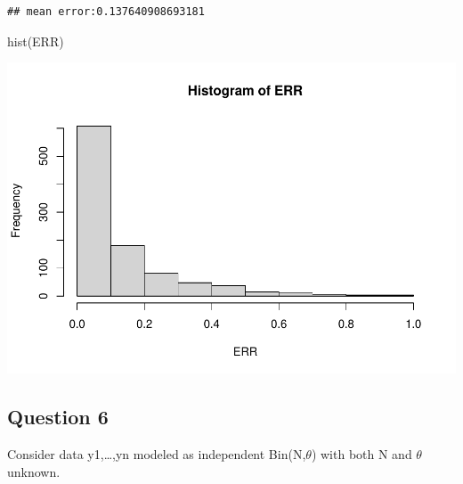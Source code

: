 \documentclass[
]{book}
\newenvironment{Shaded}{\begin{snugshade}}{\end{snugshade}}
\newcommand{\FunctionTok}[1]{\textcolor[rgb]{0.00,0.00,0.00}{#1}}
\newcommand{\NormalTok}[1]{#1}
\theoremstyle{definition}
\theoremstyle{definition}
\theoremstyle{definition}
\theoremstyle{definition}
\theoremstyle{remark}
\begin{document}
\begin{verbatim}
## mean error:0.137640908693181
\end{verbatim}

\begin{Shaded}
\begin{Highlighting}[]
 \FunctionTok{hist}\NormalTok{(ERR)}
\end{Highlighting}
\end{Shaded}

\includegraphics{_main_files/figure-latex/unnamed-chunk-42-1.pdf}

\hypertarget{question-6}{%
\subsection*{Question 6}\label{question-6}}

Consider data y1,\ldots,yn modeled as independent Bin(N,\(\theta\)) with both N and \(\theta\) unknown.
\end{document}
